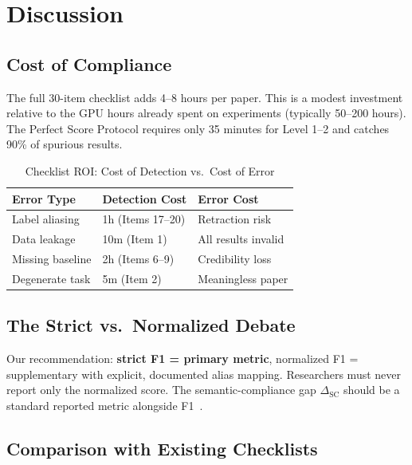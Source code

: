 \documentclass[review,3p]{elsarticle}
\begin{document}
\section{Discussion}

\subsection{Cost of Compliance}
The full 30-item checklist adds 4--8 hours per paper. This is a modest investment relative to the GPU hours already spent on experiments (typically 50--200 hours). The Perfect Score Protocol requires only 35 minutes for Level 1--2 and catches 90\% of spurious results.

\begin{table}[!ht]
\centering
\caption{Checklist ROI: Cost of Detection vs.\ Cost of Error}
\label{tab:roi}
\begin{tabular}{lll}
\toprule
\textbf{Error Type} & \textbf{Detection Cost} & \textbf{Error Cost} \\
\midrule
Label aliasing & 1h (Items 17--20) & Retraction risk \\
Data leakage & 10m (Item 1) & All results invalid \\
Missing baseline & 2h (Items 6--9) & Credibility loss \\
Degenerate task & 5m (Item 2) & Meaningless paper \\
\bottomrule
\end{tabular}
\end{table}

\subsection{The Strict vs.\ Normalized Debate}
Our recommendation: \textbf{strict F1 = primary metric}, normalized F1 = supplementary with explicit, documented alias mapping. Researchers must never report only the normalized score. The semantic-compliance gap $\Delta_\text{SC}$ should be a standard reported metric alongside F1~\cite{p3}.

\subsection{Comparison with Existing Checklists}
\end{document}
